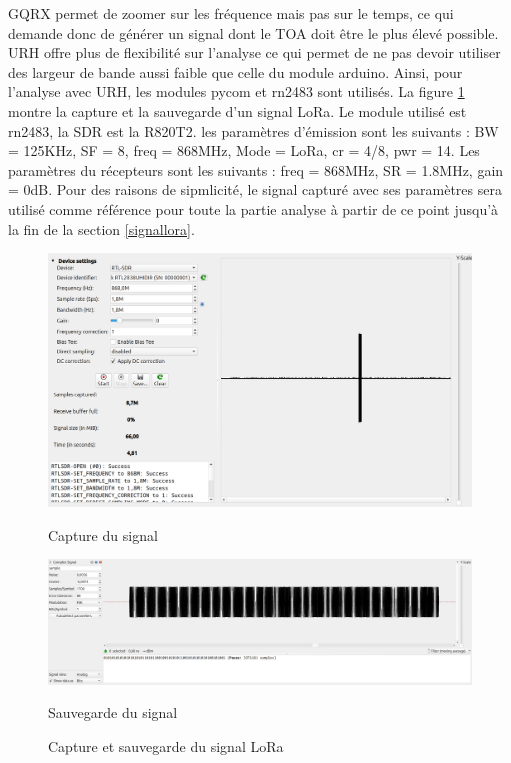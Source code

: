 GQRX permet de zoomer sur les fréquence mais pas sur le temps, ce qui demande donc de générer un signal dont le TOA doit être le plus élevé possible. URH offre plus de flexibilité sur l'analyse ce qui permet de ne pas devoir utiliser des largeur de bande aussi faible que celle du module arduino. Ainsi, pour l'analyse avec URH, les modules pycom et rn2483 sont utilisés. La figure \ref{term305} montre la capture et la sauvegarde d'un signal LoRa. Le module utilisé est rn2483, la SDR est la R820T2. les paramètres d'émission sont les suivants : BW = 125KHz, SF = 8, freq = 868MHz, Mode = LoRa, cr = 4/8, pwr = 14. Les paramètres du récepteurs sont les suivants : freq = 868MHz, SR = 1.8MHz, gain = 0dB. Pour des raisons de sipmlicité, le signal capturé avec ses paramètres sera utilisé comme référence pour toute la partie analyse à partir de ce point jusqu'à la fin de la section \ref{signallora}.

\newpage

\begin{figure}[h]
    \centering
    \begin{minipage}[t]{\textwidth}
        \centering
        \includegraphics[width=\textwidth]{images/urh2n.png}
        \caption{Capture du signal}
        \label{term303}
    \end{minipage}
    
    \vspace{1cm}
    
    \begin{minipage}[t]{\textwidth}
        \centering
        \includegraphics[width=\textwidth]{images/urh3n.png}
        \caption{Sauvegarde du signal}
        \label{term304}
    \end{minipage}
    \caption{Capture et sauvegarde du signal LoRa}
    \label{term305}
\end{figure}


